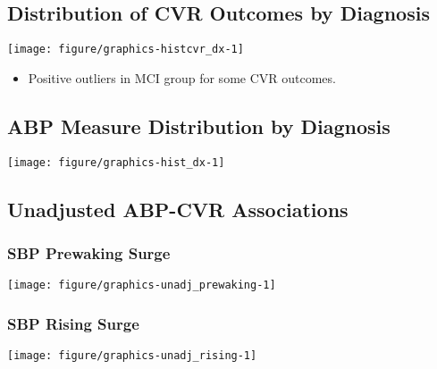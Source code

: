 \documentclass[10pt]{article}\usepackage[]{graphicx}\usepackage[]{color}
\makeatletter
\def\maxwidth{ %
  \ifdim\Gin@nat@width>\linewidth
    \linewidth
  \else
    \Gin@nat@width
  \fi
}
\newenvironment{knitrout}{}{} %
\makeatother
\begin{document}
\clearpage
\subsection{Distribution of CVR Outcomes by Diagnosis}

\begin{knitrout}
\color{fgcolor}

{\centering \texttt{[image: figure/graphics-histcvr\_dx-1]} 

}



\end{knitrout}

\begin{itemize}
  \item Positive outliers in MCI group for some CVR outcomes.
\end{itemize}

\clearpage
\subsection{ABP Measure Distribution by Diagnosis}

\begin{knitrout}
\color{fgcolor}

{\centering \texttt{[image: figure/graphics-hist\_dx-1]} 

}



\end{knitrout}

\clearpage
\subsection{Unadjusted ABP-CVR Associations}
\subsubsection{SBP Prewaking Surge}
\begin{knitrout}
\color{fgcolor}

{\centering \texttt{[image: figure/graphics-unadj\_prewaking-1]} 

}



\end{knitrout}
\clearpage
\subsubsection{SBP Rising Surge}
\begin{knitrout}
\color{fgcolor}

{\centering \texttt{[image: figure/graphics-unadj\_rising-1]} 

}



\end{knitrout}
\clearpage
\end{document}
